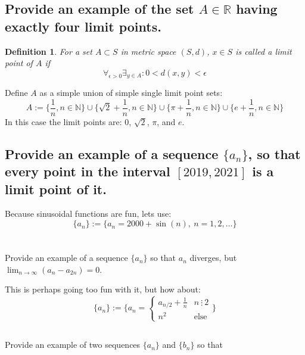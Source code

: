 \documentclass[]{article}
\newcommand{\R}{\mathbb{R}}
\newcommand{\N}{\mathbb{N}}
\newcommand{\divisible}{ \ \vdots \ }
\newtheorem{definition}{Definition}
\begin{document}
\subsection{Provide an example of the set $A \in \R$ having exactly four limit points.}
\begin{definition}
    For a set $A \subset S$ in metric space $(S,d)$, $x \in S$ is called a \emph{limit point} of $A$ if 
    \[\forall_{\epsilon>0}\exists_{y\in A} : 0 < d(x,y) < \epsilon\]
\end{definition}

Define $A$ as a simple union of simple single limit point sets:
\[A := \{\frac{1}{n}, n \in \N\} 
    \cup \{\sqrt{2} + \frac{1}{n}, n \in \N\}
    \cup \{\pi + \frac{1}{n}, n \in \N\}
    \cup \{e + \frac{1}{n}, n \in \N\}
\]
In this case the limit points are: $0$, $\sqrt{2}$, $\pi$, and $e$.


\subsection{Provide an example of a sequence $\{a_n\}$, so that every point in the interval $[2019,2021]$ is a limit point of it.}

Because sinusoidal functions are fun, lets use:
\[\{a_n\} := \{a_n = 2000 + \sin(n), \ n = 1, 2, \dots\}\]


\newpage
\section{}
\subsection{}
Provide an example of a sequence $\{a_n\}$ so that $a_n$ diverges, but $\lim_{n\to\infty} (a_n - a_{2n}) = 0$.

This is perhaps going too fun with it, but how about:
\[
    \{a_n\} := \{a_n = 
    \begin{cases}
        a_{n/2} + \frac{1}{n} &n \divisible 2\\
        n^2 &\text{else}
    \end{cases}\}
\]

\subsection{}
Provide an example of two sequences $\{a_n\}$ and $\{b_n\}$ so that
    
\end{document}
